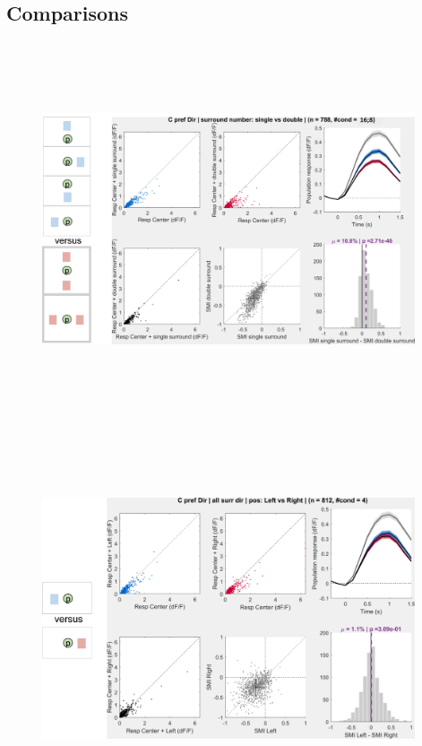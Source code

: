 \subsection{Comparisons}

\begin{figure}[H] \centering \includegraphics[width=11cm,height=11cm,keepaspectratio]{Figures/7.Results/population/sel/diagrams/1.png} 
\end{figure}

\begin{figure}[H] \centering \includegraphics[width=11cm,height=11cm,keepaspectratio]{Figures/7.Results/population/sel/diagrams/2.png} 
\end{figure}


